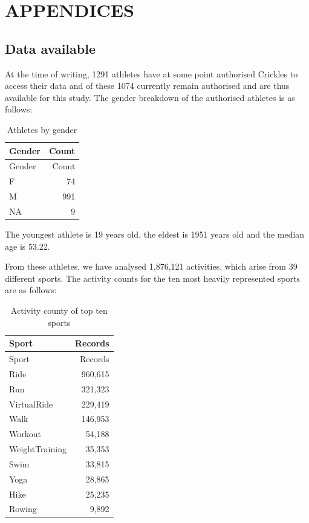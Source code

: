 \documentclass[
  letterpaper,
  DIV=11,
  numbers=noendperiod]{scrartcl}
\begin{document}
\section{APPENDICES}\label{appendices}

\subsection{Data available}\label{data-available}

At the time of writing, 1291 athletes have at some point authorised
Crickles to access their data and of these 1074 currently remain
authorised and are thus available for this study. The gender breakdown
of the authorised athletes is as follows:

\begin{longtable}[]{@{}lr@{}}
\caption{Athletes by gender}\tabularnewline
\toprule\noalign{}
Gender & Count \\
\midrule\noalign{}
\endfirsthead
\toprule\noalign{}
Gender & Count \\
\midrule\noalign{}
\endhead
\bottomrule\noalign{}
\endlastfoot
F & 74 \\
M & 991 \\
NA & 9 \\
\end{longtable}

The youngest athlete is 19 years old, the eldest is 1951 years old and
the median age is 53.22.

From these athletes, we have analysed 1,876,121 activities, which arise
from 39 different sports. The activity counts for the ten most heavily
represented sports are as follows:

\begin{longtable}[]{@{}lr@{}}
\caption{Activity county of top ten sports}\tabularnewline
\toprule\noalign{}
Sport & Records \\
\midrule\noalign{}
\endfirsthead
\toprule\noalign{}
Sport & Records \\
\midrule\noalign{}
\endhead
\bottomrule\noalign{}
\endlastfoot
Ride & 960,615 \\
Run & 321,323 \\
VirtualRide & 229,419 \\
Walk & 146,953 \\
Workout & 54,188 \\
WeightTraining & 35,353 \\
Swim & 33,815 \\
Yoga & 28,865 \\
Hike & 25,235 \\
Rowing & 9,892 \\
\end{longtable}
\end{document}
